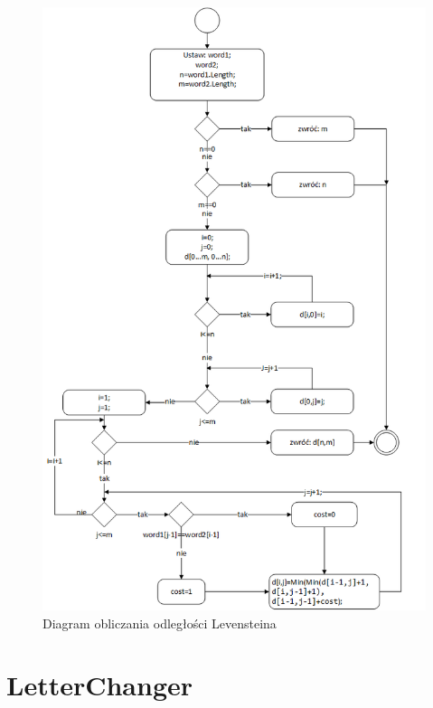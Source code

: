 \begin{figure} [H]
	\centering
	\includegraphics[width=1\linewidth]{rozdzial02/Levenstein-Count.png}
	\caption{Diagram obliczania odległości Levensteina}
	\label{fig:Lev-Count}
\end{figure}


\section{LetterChanger}

